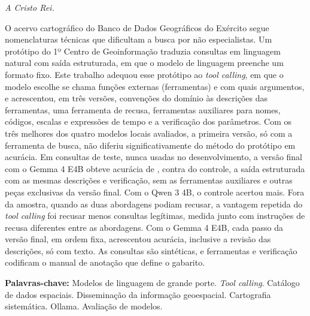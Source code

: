 \begin{dedicatoria}
   \vspace*{\fill}
   \centering
   \noindent
   \textit{A Cristo Rei.} \vspace*{\fill}
\end{dedicatoria}


\setlength{\absparsep}{18pt}
\begin{resumo}
\SingleSpacing
O acervo cartográfico do Banco de Dados Geográficos do Exército segue nomenclaturas técnicas que dificultam a busca por não especialistas. Um protótipo do 1º Centro de Geoinformação traduzia consultas em linguagem natural com saída estruturada, em que o modelo de linguagem preenche um formato fixo. Este trabalho adequou esse protótipo ao \textit{tool calling}, em que o modelo escolhe se chama funções externas (ferramentas) e com quais argumentos, e acrescentou, em três versões, convenções do domínio às descrições das ferramentas, uma ferramenta de recusa, ferramentas auxiliares para nomes, códigos, escalas e expressões de tempo e a verificação dos parâmetros. Com os três melhores dos quatro modelos locais avaliados, a primeira versão, só com a ferramenta de busca, não diferiu significativamente do método do protótipo em acurácia. Em  consultas de teste, nunca usadas no desenvolvimento, a versão final com o Gemma 4 E4B obteve acurácia de , contra  do controle, a saída estruturada com as mesmas descrições e verificação, sem as ferramentas auxiliares e outras peças exclusivas da versão final. Com o Qwen 3 4B, o controle acertou mais. Fora da amostra, quando as duas abordagens podiam recusar, a vantagem repetida do \textit{tool calling} foi recusar menos consultas legítimas, medida junto com instruções de recusa diferentes entre as abordagens. Com o Gemma 4 E4B, cada passo da versão final, em ordem fixa, acrescentou acurácia, inclusive a revisão das descrições, só com texto. As consultas são sintéticas, e ferramentas e verificação codificam o manual de anotação que define o gabarito.

\textbf{Palavras-chave:} Modelos de linguagem de grande porte. \textit{Tool calling}. Catálogo de dados espaciais. Disseminação da informação geoespacial. Cartografia sistemática. Ollama. Avaliação de modelos.

\end{resumo}

